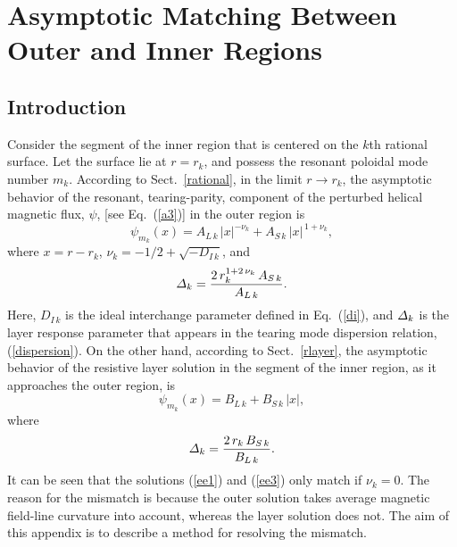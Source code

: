 \documentclass[12pt,prb,aps]{revtex4-1}
\begin{document}
\section{Asymptotic Matching Between Outer and Inner Regions}\label{asym}
\subsection{Introduction}
Consider the segment of the inner region that is centered on the $k$th rational surface. Let the surface lie at $r=r_k$, and possess the
resonant poloidal mode number $m_k$. According to Sect.~\ref{rational},   in the limit $r\rightarrow r_k$,  the asymptotic behavior of the resonant, tearing-parity, component of the perturbed helical magnetic 
flux, $\psi$,  [see Eq.~(\ref{a3})] in the outer region is
\begin{equation}\label{ee1}
\psi_{m_k}(x) = A_{L\,k}\,|x|^{-\nu_k} + A_{S\,k}\,|x|^{\,1+\nu_k},
\end{equation}
where $x=r-r_k$, $\nu_k= -1/2+\sqrt{-D_{I\,k}}$, and
\begin{equation}
{\mit\Delta}_k = \frac{2\,r_k^{1+2\,\nu_k}\,A_{S\,k}}{A_{L\,k}}.
\end{equation}
Here, $D_{I\,k}$ is the ideal interchange parameter defined in Eq.~(\ref{di}), and ${\mit\Delta}_k$ is the layer response parameter that appears in the
tearing mode dispersion relation, (\ref{dispersion}). On the other hand, according to Sect.~\ref{rlayer}, the asymptotic behavior of the resistive layer
solution in the segment of the inner region, as it approaches the outer region,  is
\begin{equation}\label{ee3}
\psi_{m_k}(x) = B_{L\,k}+B_{S\,k}\,|x|,
\end{equation}
where
\begin{equation}\label{ee4}
{\mit\Delta}_k = \frac{2\,r_k\,B_{S\,k}}{B_{L\,k}}.
\end{equation}
It can be seen that the  solutions (\ref{ee1}) and (\ref{ee3})  only match if $\nu_k=0$. The reason for the mismatch is because the outer solution takes average magnetic field-line curvature into
account,\cite{ggj,ggj1} whereas the layer solution does not. The aim of this appendix is to describe a method for resolving the mismatch. 
\end{document}
